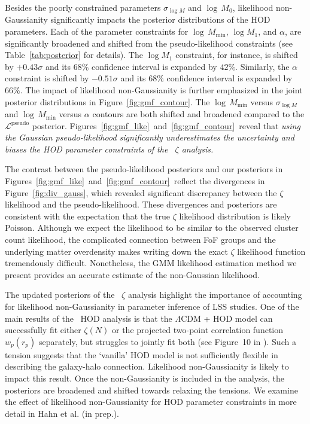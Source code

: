 \documentclass[12pt, letterpaper, preprint]{aastex}
\newcommand{\Sinh}{\citetalias{sinha2017}\xspace}
\newcommand{\lss}{{\small{LSS}}\xspace}
\newcommand{\gmm}{{\small{GMM}}\xspace}
\begin{document}
Besides the poorly constrained parameters $\sigma_{\log M}$ and $\log\, M_0$, 
likelihood non-Gaussianity significantly impacts the posterior 
distributions of the HOD parameters. Each of the parameter constraints 
for $\log\,M_\mathrm{min}$, $\log M_1$, and $\alpha$, are significantly 
broadened and shifted from the pseudo-likelihood constraints
(see Table~\ref{tab:posterior} for details). The $\log M_1$ constraint, 
for instance, is shifted by $+0.43 \sigma$ and its $68\%$ confidence
interval is expanded by $42\%$. Similarly, the $\alpha$ constraint is
shifted by $-0.51 \sigma$ and its $68\%$ confidence interval is expanded 
by $66\%$. The impact of likelihood non-Gaussianity is further emphasized in 
the joint posterior distributions in Figure~\ref{fig:gmf_contour}.
The $\log\,M_\mathrm{min}$ versus $\sigma_{\log M}$ and 
$\log\,M_\mathrm{min}$ versus $\alpha$ contours are both shifted 
and broadened compared to the $\mathcal{L}^\mathrm{pseudo}$ 
posterior. Figures~\ref{fig:gmf_like}~and~\ref{fig:gmf_contour}~reveal 
that \emph{using the Gaussian pseudo-likelihood significantly 
underestimates the uncertainty and biases the HOD parameter constraints 
of the \Sinh~$\zeta$ analysis.}

The contrast between the pseudo-likelihood posteriors and our posteriors
in Figures~\ref{fig:gmf_like}~and~\ref{fig:gmf_contour}~reflect 
the divergences in Figure~\ref{fig:div_gauss}, which revealed significant
discrepancy between the $\zeta$ likelihood and the pseudo-likelihood. 
These divergences and posteriors are consistent with the expectation 
that the true $\zeta$ likelihood distribution is likely Poisson. Although 
we expect the likelihood to be similar to the observed cluster count likelihood, 
the complicated connection between FoF groups and the underlying 
matter overdensity makes writing down the exact $\zeta$ likelihood function 
tremendously difficult. Nonetheless, the \gmm likelihood estimation method we 
present provides an accurate estimate of the non-Gaussian likelihood. 

The updated posteriors of the \Sinh~$\zeta$ analysis highlight the importance of 
accounting for likelihood non-Gaussianity in parameter inference of 
\lss studies. One of the main results of the \Sinh~HOD analysis 
is that the $\Lambda$CDM + HOD model can successfully 
fit either $\zeta(N)$ or the projected two-point correlation function 
$w_p(r_p)$ separately, but struggles to jointly fit both (see Figure~10 in \Sinh). 
Such a tension suggests that the `vanilla' HOD model is not sufficiently 
flexible in describing the galaxy-halo connection. Likelihood non-Gaussianity
is likely to impact this result. Once the non-Gaussianity is included in 
the analysis, the posteriors are broadened and shifted towards 
relaxing the tensions. We examine the effect of likelihood non-Gaussianity 
for HOD parameter constraints in more detail in Hahn et al. (in prep.). 
\end{document}
